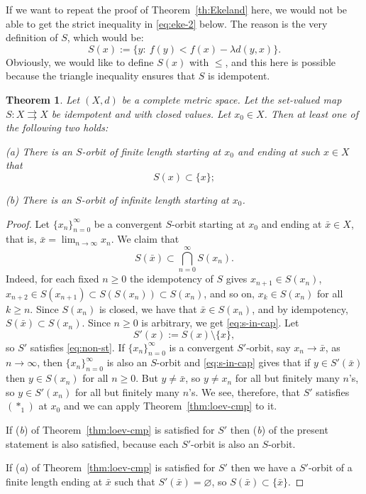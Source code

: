 \documentclass[12pt]{article}
\newtheorem{theorem}{Theorem}[section]
\newcommand{\astone}{(\ast_1)}
\renewcommand{\emptyset}{\varnothing}
\begin{document}
    If we want to repeat the proof of Theorem~\ref{th:Ekeland} here, we would not be able to get the strict inequality in \eqref{eq:eke-2} below. The reason is the very definition of $S$, which would be:
    $$
        S(x) := \{y:\  f(y) < f(x) -\lambda d(y,x)\}.
    $$
    Obviously, we would like to define  $S(x)$ with $\le$, and this here is possible because the triangle inequality ensures that $S$ is idempotent.
    \begin{theorem}
        \label{thm:loev-mon}
        Let $(X,d)$ be a complete metric space. Let the set-valued map $S:X\rightrightarrows X$ be idempotent and with closed values. Let $x_0\in X$. Then at least one of the following two holds:
 
           (a) There is an $S$-orbit of finite length starting at $x_0$ and ending at such $x\in X$ that
            $$
                S(x) \subset \{x\};
            $$
            
           (b) There is an $S$-orbit of infinite length starting at $x_0$.
      \end{theorem}
    \begin{proof}
        Let $\{x_n\}_{n=0}^\infty$ be a convergent $S$-orbit starting at $x_0$ and ending at $\bar x\in X$, that is, $\bar x = \lim_{n\to\infty}x_n$. We claim that
        \begin{equation}
            \label{eq:s-in-cap}
            S(\bar x) \subset \bigcap_{n=0}^\infty S(x_n).
        \end{equation}
        Indeed, for each fixed $n\ge0$ the idempotency of $S$ gives $x_{n+1}\in S(x_n)$, $x_{n+2}\in S(x_{n+1})\subset S(S(x_n)) \subset S(x_n)$, and so on, $x_k\in S(x_n)$ for all $k\ge n$. Since $S(x_n)$ is closed, we have that $\bar x\in S(x_n)$, and by idempotency, $S(\bar x) \subset S(x_n)$. Since $n\ge0$ is arbitrary, we get \eqref{eq:s-in-cap}. Let
        $$
            S'(x) := S(x) \setminus \{x\},
        $$
        so $S'$ satisfies \eqref{eq:non-st}. If  $\{x_n\}_{n=0}^\infty$ is a convergent $S'$-orbit, say $x_n\to\bar x$, as $n\to\infty$, then $\{x_n\}_{n=0}^\infty$ is also an $S$-orbit and \eqref{eq:s-in-cap} gives that if $y\in S'(\bar x)$ then $y\in S(x_n)$ for all $n\ge0$. But $y\neq \bar x$, so $y\neq x_n$ for all but finitely many $n$'s, so $y\in S'(x_n)$ for all but finitely many $n$'s. We see, therefore, that $S'$ satisfies $\astone$ at $x_0$ and we can apply Theorem~\ref{thm:loev-cmp} to it.

        If (\emph{b}) of  Theorem~\ref{thm:loev-cmp} is satisfied for $S'$ then (\emph{b}) of the present statement is also satisfied, because each $S'$-orbit is also an $S$-orbit.

        If (\emph{a}) of  Theorem~\ref{thm:loev-cmp} is satisfied for $S'$ then we have a $S'$-orbit of a finite length ending at $\bar x$ such that $S'(\bar x) = \emptyset$, so $S(\bar x) \subset \{\bar x\}$.
    \end{proof}
\end{document}
